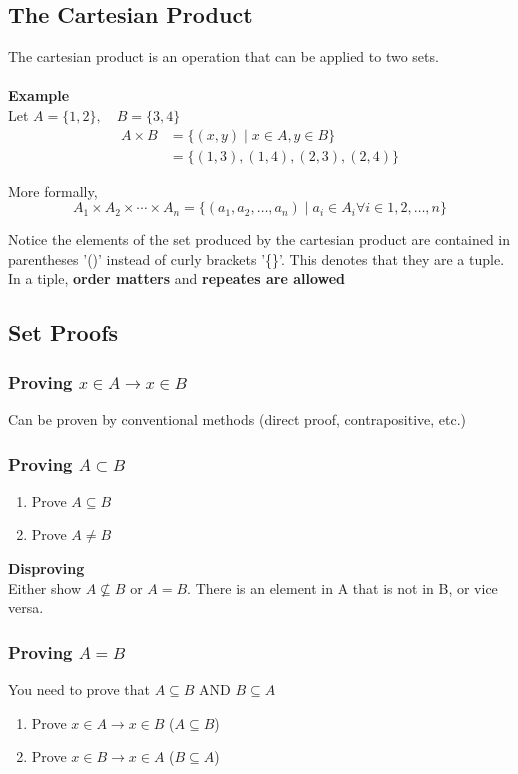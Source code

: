 \documentclass[12pt]{article}
\begin{document}
	\subsection{The Cartesian Product}
	The cartesian product is an operation that can be applied to two sets.\\\\
	\textbf{Example}\\
	Let $A = \{1, 2\},\quad B = \{3, 4\}$
	\begin{align*}
		A \times B &= \{(x, y) \mid x \in A, y \in B\} \\
		&= \{(1, 3), (1, 4), (2, 3), (2, 4)\} 
	\end{align*}

	More formally,
	$$ A_1 \times A_2 \times \cdots \times A_n = \{(a_1, a_2, \ldots, a_n) \mid a_i \in A_i \forall i \in {1, 2, \ldots, n} \} $$

	Notice the elements of the set produced by the cartesian product are contained in parentheses '()' instead of curly brackets '\{\}'. This denotes that they are a tuple. In a tiple, \textbf{order matters} and \textbf{repeates are allowed}

	\subsection{Set Proofs}
	\subsubsection{Proving $x \in A \rightarrow x \in B$}
	Can be proven by conventional methods (direct proof, contrapositive, etc.)
	\subsubsection{Proving $A \subset B$}
	\begin{enumerate}
		\item Prove $A \subseteq B$
		\item Prove $A \neq B$
	\end{enumerate}
	\textbf{Disproving}\\
	Either show $A \nsubseteq B$ or $A = B$. There is an element in A that is not in B, or vice versa.
	\subsubsection{Proving $A = B$}
	You need to prove that $A \subseteq B$ AND $B \subseteq A$
	\begin{enumerate}
		\item Prove $x \in A \rightarrow x \in B$ ($A \subseteq B$)
		\item Prove $x \in B \rightarrow x \in A$ ($B \subseteq A$)
	\end{enumerate}
\end{document}
